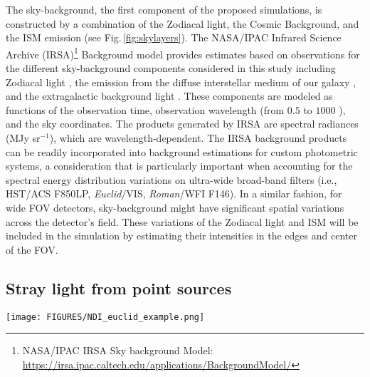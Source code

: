 \documentclass[usenames,dvipsnames,modern]{CLASS_FILES/aastex631}  %
\newcommand{\RST}{\emph{Roman}}
\newcommand{\Euclid}{\emph{Euclid}}
\begin{document}
The sky-background, the first component of the proposed simulations, is constructed by a combination of the Zodiacal light, the Cosmic Background, and the ISM emission (see Fig.\,\ref{fig:skylayers}). The NASA/IPAC Infrared Science Archive (IRSA)\footnote{NASA/IPAC IRSA Sky background Model: \url{https://irsa.ipac.caltech.edu/applications/BackgroundModel/}} Background model provides estimates based on observations for the different sky-background components considered in this study including Zodiacal light \citep[based on the models from][to the COBE/DIRBE data]{wright1998apj496_1,gorjian+2000apj536_550}, the emission from the diffuse interstellar medium of our galaxy \citep{arendt+1998apj508_74,schlegel+1998apj500_525,zubko+2004apj152_211, brandt+2012apj744_129}, and the extragalactic background light \citep{mazin+2007aap471_439, chary+2010arxiv1003.1731, dwek+2013afz43_112}. These components are modeled as functions of the observation time, observation wavelength (from $0.5$ to $1000$ \micron), and the sky coordinates. The products generated by IRSA are spectral radiances (MJy sr$^{-1}$), which are wavelength-dependent. The IRSA background products can be readily incorporated into background estimations for custom photometric systems, a consideration that is particularly important when accounting for the spectral energy distribution variations on ultra-wide broad-band filters (i.e., HST/ACS F850LP, \Euclid/VIS, \RST/WFI F146). In a similar fashion, for wide FOV detectors, sky-background might have significant spatial variations across the detector's field. These variations of the Zodiacal light and ISM will be included in the simulation by estimating their intensities in the edges and center of the FOV. 



\subsection{Stray light from point sources}
\label{Subsec:methods_stars}

\begin{figure*}[t!]
 \begin{center}
\texttt{[image: FIGURES/NDI\_euclid\_example.png]}
\vspace{-1.3cm}
\caption{Example of out of field stray light modelling on \Euclid/VIS, adapted from \citet{borlaff+2021arxiv2108.10321}. \textbf{\emph{Left}}: simulation of an observation with \Euclid/VIS near the Orion's Belt; \emph{Red square:} VIS footprint. \emph{Gray circles:} Stars outside focal plane; circle radii are log-scaled to VIS band stellar flux. \emph{Purple circles:} Stray light contamination level at corners and center of VIS focal plane. \textbf{\emph{Right}}: predicted stray light level in e$^-$ per pixel, for the 36 independent CCD VIS detectors.}
\label{fig:outfield_straylight}
\end{center}
\end{figure*}
\end{document}
